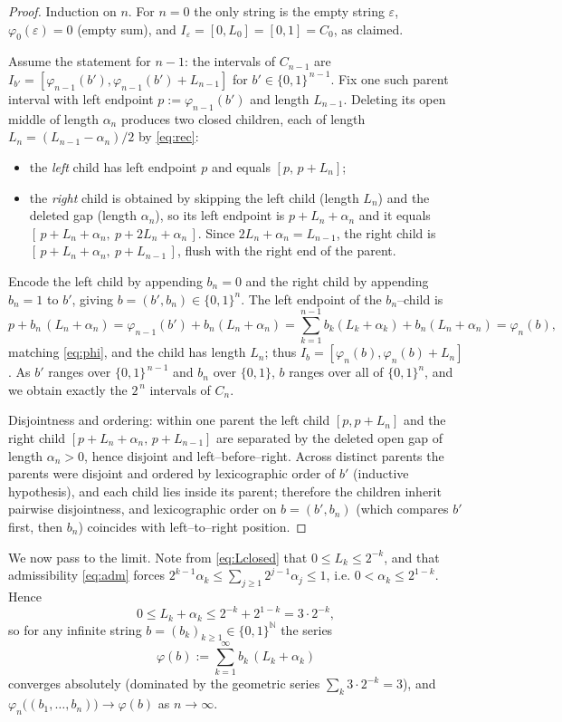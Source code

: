 \documentclass[11pt]{article}
\theoremstyle{definition}
\theoremstyle{remark}
\begin{document}
\begin{proof}
Induction on $n$. For $n=0$ the only string is the empty string $\varepsilon$,
$\varphi_0(\varepsilon)=0$ (empty sum), and
$I_\varepsilon=[0,L_0]=[0,1]=C_0$, as claimed.

Assume the statement for $n-1$: the intervals of $C_{n-1}$ are
$I_{b'}=[\varphi_{n-1}(b'),\varphi_{n-1}(b')+L_{n-1}]$ for
$b'\in\{0,1\}^{\,n-1}$. Fix one such parent interval with left endpoint
$p:=\varphi_{n-1}(b')$ and length $L_{n-1}$. Deleting its open middle of length
$\alpha_n$ produces two closed children, each of length
$L_n=(L_{n-1}-\alpha_n)/2$ by \eqref{eq:rec}:
\begin{itemize}
\item the \emph{left} child has left endpoint $p$ and equals $[p,\,p+L_n]$;
\item the \emph{right} child is obtained by skipping the left child (length
$L_n$) and the deleted gap (length $\alpha_n$), so its left endpoint is
$p+L_n+\alpha_n$ and it equals $[\,p+L_n+\alpha_n,\ p+2L_n+\alpha_n\,]$. Since
$2L_n+\alpha_n=L_{n-1}$, the right child is $[\,p+L_n+\alpha_n,\ p+L_{n-1}\,]$,
flush with the right end of the parent.
\end{itemize}
Encode the left child by appending $b_n=0$ and the right child by appending
$b_n=1$ to $b'$, giving $b=(b',b_n)\in\{0,1\}^{n}$. The left endpoint of the
$b_n$--child is
\[
p+b_n\,(L_n+\alpha_n)
=\varphi_{n-1}(b')+b_n(L_n+\alpha_n)
=\sum_{k=1}^{n-1}b_k(L_k+\alpha_k)+b_n(L_n+\alpha_n)
=\varphi_n(b),
\]
matching \eqref{eq:phi}, and the child has length $L_n$; thus
$I_b=[\varphi_n(b),\varphi_n(b)+L_n]$. As $b'$ ranges over $\{0,1\}^{\,n-1}$ and
$b_n$ over $\{0,1\}$, $b$ ranges over all of $\{0,1\}^{n}$, and we obtain exactly
the $2^{\,n}$ intervals of $C_n$.

Disjointness and ordering: within one parent the left child $[p,p+L_n]$ and the
right child $[p+L_n+\alpha_n,\,p+L_{n-1}]$ are separated by the deleted open gap
of length $\alpha_n>0$, hence disjoint and left--before--right. Across distinct
parents the parents were disjoint and ordered by lexicographic order of $b'$
(inductive hypothesis), and each child lies inside its parent; therefore the
children inherit pairwise disjointness, and lexicographic order on $b=(b',b_n)$
(which compares $b'$ first, then $b_n$) coincides with left--to--right position.
\end{proof}

We now pass to the limit. Note from \eqref{eq:Lclosed} that
$0\le L_k\le 2^{-k}$, and that admissibility \eqref{eq:adm} forces
$2^{k-1}\alpha_k\le \sum_{j\ge1}2^{j-1}\alpha_j\le 1$, i.e.
$0<\alpha_k\le 2^{1-k}$. Hence
\begin{equation}\label{eq:gapbound}
0\le L_k+\alpha_k\le 2^{-k}+2^{1-k}=3\cdot 2^{-k},
\end{equation}
so for any infinite string $b=(b_k)_{k\ge1}\in\{0,1\}^{\mathbb N}$ the series
\begin{equation}\label{eq:phiinf}
\varphi(b):=\sum_{k=1}^{\infty}b_k\,(L_k+\alpha_k)
\end{equation}
converges absolutely (dominated by the geometric series
$\sum_k 3\cdot2^{-k}=3$), and $\varphi_n\bigl((b_1,\dots,b_n)\bigr)\to\varphi(b)$
as $n\to\infty$.
\end{document}
